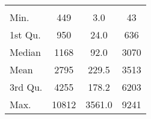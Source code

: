 \begin{tabular}{lS[table-format=5.1]S[table-format=5.1]S[table-format=5.1]}
&  &  &  \\
 Min.    & 449 & 3.0 & 43 \\
 1st Qu. & 950 & 24.0 & 636 \\
 Median  & 1168 & 92.0 & 3070 \\
 Mean    & 2795 & 229.5 & 3513 \\
 3rd Qu. & 4255 & 178.2 & 6203 \\
 Max.    & 10812 & 3561.0 & 9241 \\
\end{tabular}

